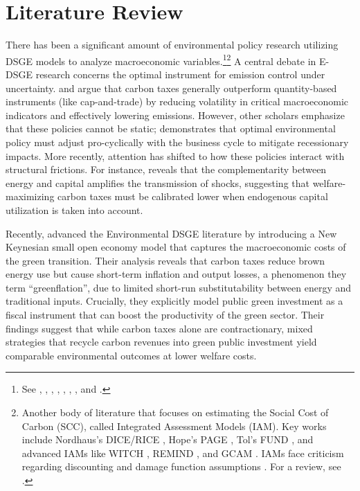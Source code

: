 \documentclass[12pt, a4paper]{article}
\begin{document}
	\section{Literature Review}
	There has been a significant amount of environmental policy research utilizing DSGE models to analyze macroeconomic variables.\footnote{See \citep{annicchiarico2015}, \citep{dissou2016}, \citep{annicchiarico2017}, \citep{khan2019}, \citep{chan2020a}, \citep{chan2020b}, \citep{lintunen2021}, and \citep{xiao2022}.}\footnote{Another body of literature that focuses on estimating the Social Cost of Carbon (SCC), called Integrated Assessment Models (IAM). Key works include Nordhaus's DICE/RICE \citep{nordhaus1992, nordhaus1994}, Hope's PAGE \citep{hope2006}, Tol's FUND \citep{tol2002}, and advanced IAMs like WITCH \citep{bosetti2006}, REMIND \citep{bauer2013}, and GCAM \citep{calvin2019}. IAMs face criticism regarding discounting and damage function assumptions \citep{weitzman2009, pindyck2017}. For a review, see \citet{fernandez2025}.} A central debate in E-DSGE research concerns the optimal instrument for emission control under uncertainty. \citet{fischer2011} and \citet{bosetti2013} argue that carbon taxes generally outperform quantity-based instruments (like cap-and-trade) by reducing volatility in critical macroeconomic indicators and effectively lowering emissions. However, other scholars emphasize that these policies cannot be static; \citet{heutel2012} demonstrates that optimal environmental policy must adjust pro-cyclically with the business cycle to mitigate recessionary impacts. More recently, attention has shifted to how these policies interact with structural frictions. For instance, \citet{chan2023} reveals that the complementarity between energy and capital amplifies the transmission of shocks, suggesting that welfare-maximizing carbon taxes must be calibrated lower when endogenous capital utilization is taken into account.
	
	Recently, \citet{airaudo2025green} advanced the Environmental DSGE literature by introducing a New Keynesian small open economy model that captures the macroeconomic costs of the green transition. Their analysis reveals that carbon taxes reduce brown energy use but cause short-term inflation and output losses, a phenomenon they term ``greenflation'', due to limited short-run substitutability between energy and traditional inputs. Crucially, they explicitly model public green investment as a fiscal instrument that can boost the productivity of the green sector. Their findings suggest that while carbon taxes alone are contractionary, mixed strategies that recycle carbon revenues into green public investment yield comparable environmental outcomes at lower welfare costs. 
	
\end{document}
